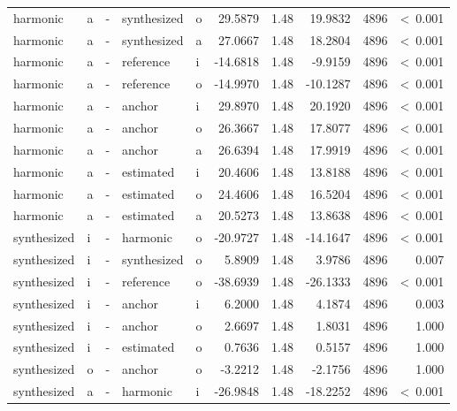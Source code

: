 \documentclass[a4paper,man,hidelinks,floatsintext]{apa7}
\begin{document}
\begin{table}[!htbp]
\begin{adjustbox}{max size={\columnwidth}{\textheight}}
\begin{tabular}{llrllrrrrr}
harmonic    & a     & - & synthesized & o     &    29.5879 & 1.48 &  19.9832 & 4896 &  \textless~0.001 \\
harmonic    & a     & - & synthesized & a     &    27.0667 & 1.48 &  18.2804 & 4896 &  \textless~0.001 \\
harmonic    & a     & - & reference   & i     &   -14.6818 & 1.48 &  -9.9159 & 4896 &  \textless~0.001 \\
harmonic    & a     & - & reference   & o     &   -14.9970 & 1.48 & -10.1287 & 4896 &  \textless~0.001 \\
harmonic    & a     & - & anchor      & i     &    29.8970 & 1.48 &  20.1920 & 4896 &  \textless~0.001 \\
harmonic    & a     & - & anchor      & o     &    26.3667 & 1.48 &  17.8077 & 4896 &  \textless~0.001 \\
harmonic    & a     & - & anchor      & a     &    26.6394 & 1.48 &  17.9919 & 4896 &  \textless~0.001 \\
harmonic    & a     & - & estimated   & i     &    20.4606 & 1.48 &  13.8188 & 4896 &  \textless~0.001 \\
harmonic    & a     & - & estimated   & o     &    24.4606 & 1.48 &  16.5204 & 4896 &  \textless~0.001 \\
harmonic    & a     & - & estimated   & a     &    20.5273 & 1.48 &  13.8638 & 4896 &  \textless~0.001 \\
synthesized & i     & - & harmonic    & o     &   -20.9727 & 1.48 & -14.1647 & 4896 &  \textless~0.001 \\
synthesized & i     & - & synthesized & o     &     5.8909 & 1.48 &   3.9786 & 4896 &            0.007 \\
synthesized & i     & - & reference   & o     &   -38.6939 & 1.48 & -26.1333 & 4896 &  \textless~0.001 \\
synthesized & i     & - & anchor      & i     &     6.2000 & 1.48 &   4.1874 & 4896 &            0.003 \\
synthesized & i     & - & anchor      & o     &     2.6697 & 1.48 &   1.8031 & 4896 &            1.000 \\
synthesized & i     & - & estimated   & o     &     0.7636 & 1.48 &   0.5157 & 4896 &            1.000 \\
synthesized & o     & - & anchor      & o     &    -3.2212 & 1.48 &  -2.1756 & 4896 &            1.000 \\
synthesized & a     & - & harmonic    & i     &   -26.9848 & 1.48 & -18.2252 & 4896 &  \textless~0.001 \\

\end{tabular}
\end{adjustbox}
\end{table}
\end{document}
